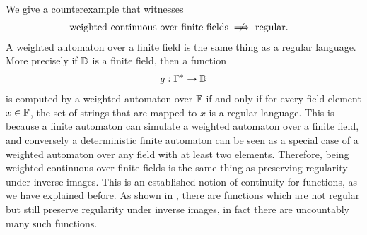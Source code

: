 \begin{myexample}
    \label{ex:not-regular-but-continuous-over-finite-fields}
    We give a counterexample that witnesses
    \begin{align*}
    \text{weighted continuous over finite fields}
    & \centernot \implies \text{regular}.
    \end{align*}
    A weighted automaton over a finite field is the same thing as a regular language. More precisely if $\mathbb D$ is a finite field, then a  function 
    \begin{align*}
    g : \Gamma^* \to \mathbb D
    \end{align*}
    is computed by a weighted automaton over $\mathbb F$ if and only if for every field element $x \in \mathbb F$, the set of strings that are mapped to $x$ is a regular language. This is because a finite automaton can simulate a weighted automaton over a finite field, and conversely a deterministic finite automaton can be seen as a special case of a weighted automaton over any field with at least two elements. Therefore, being weighted continuous over finite fields is the same thing as preserving regularity under inverse images. This is an established notion of continuity for functions, as we have explained before.  As shown in \cite{bojanczykTitoRegular23}, there are functions which are not regular but still preserve regularity under inverse images, in fact there are uncountably many such functions.
\end{myexample}


